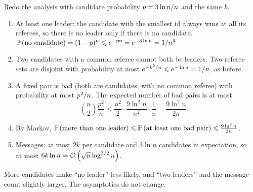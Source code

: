 \begin{exercisebox}
\begin{pproblem}[$p = 3 \ln n / n$]\label{pp:leader3}
    Redo the analysis with candidate probability $p = 3 \ln n/n$ and the same $k$.
\end{pproblem}
\tcblower
\begin{wsolution}
    \leavevmode
    \begin{enumerate}
        \item At least one leader: the candidate with the smallest id always wins at all its
              referees, so there is no leader only if there is no candidate.
              $\operatorname{\mathbb{P}}\left(\text{no candidate}\right) = (1-p)^n \leqslant e^{-pn} = e^{-3 \ln n} = 1/n^3$.
        \item Two candidates with a common referee cannot both be leaders. Two referee sets are
              disjoint with probability at most $e^{-k^2/n} \leqslant e^{-\ln n} = 1/n$, as
              before.
        \item A fixed pair is bad (both are candidates, with no common referee) with probability at
              most $p^2/n$. The expected number of bad pairs is at most
              \[\binom{n}{2} \frac{p^2}{n} \leq \frac{n^2}{2} \cdot \frac{9 \ln^2 n}{n^2} \cdot \frac{1}{n} = \frac{9 \ln^2 n}{2n}.\]
        \item By Markov,
              $\operatorname{\mathbb{P}}\left(\text{more than one leader}\right) \leqslant \operatorname{\mathbb{P}}\left(\text{at least one bad pair}\right) \leqslant \frac{9 \ln^2 n}{2n}$.
        \item Messages: at most $2k$ per candidate and $3 \ln n$ candidates in expectation, so at
              most $6k \ln n = \mathcal{O}\left(\sqrt{n} \log^{3/2} n\right)$.
    \end{enumerate}
    More candidates make ``no leader'' less likely, and ``two leaders'' and the message count
    slightly larger. The asymptotics do not change.
\end{wsolution}
\end{exercisebox}

